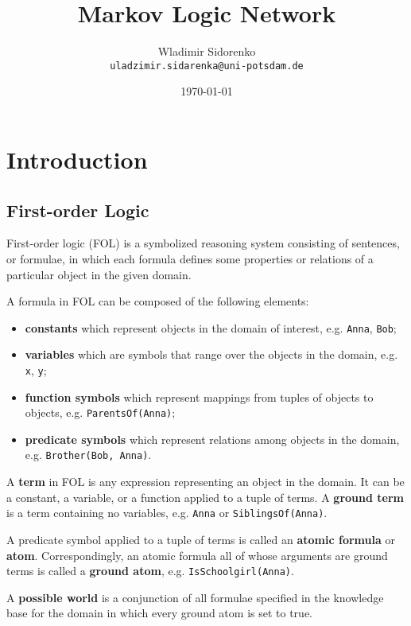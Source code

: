 \documentclass{beamer}
\title[]{Markov Logic Network}
\author[Sidorenko]{Wladimir Sidorenko\\ \texttt{uladzimir.sidarenka{@}uni-potsdam.de}}
\institute{University of Potsdam}
\date{\today}
\begin{document}
\begin{frame}{}
  \titlepage
\end{frame}

\section{Introduction}
\subsection{First-order Logic}
\begin{frame}{\insertsubsection}
  \begin{definition}
    First-order logic (FOL) is a symbolized reasoning system
    consisting of sentences, or formulae, in which each formula
    defines some properties or relations of a particular object in the
    given domain.
  \end{definition}
  A formula in FOL can be composed of the following elements:
  \begin{itemize}
    \item \textbf{constants} which represent objects in the domain of
      interest, e.g. \texttt{Anna}, \texttt{Bob};
    \item \textbf{variables} which are symbols that range over the
      objects in the domain, e.g. \texttt{x}, \texttt{y};
    \item \textbf{function symbols} which represent mappings from
      tuples of objects to objects, e.g. \texttt{ParentsOf(Anna)};
    \item \textbf{predicate symbols} which represent relations among
      objects in the domain, e.g. \texttt{Brother(Bob, Anna)}.
  \end{itemize}
\end{frame}

\begin{frame}{\insertsubsection}
A \textbf{term} in FOL is any expression representing an object in the
domain. It can be a constant, a variable, or a function applied to a
tuple of terms.  A \textbf{ground term} is a term containing no
variables, e.g. \texttt{Anna} or \texttt{SiblingsOf(Anna)}.\vspace{0.5cm}

A predicate symbol applied to a tuple of terms is called an
\textbf{atomic formula} or \textbf{atom}.  Correspondingly, an atomic
formula all of whose arguments are ground terms is called a
\textbf{ground atom}, e.g. \texttt{IsSchoolgirl(Anna)}.\vspace{0.5cm}

A \textbf{possible world} is a conjunction of all formulae specified
in the knowledge base for the domain in which every ground atom is set
to true.
\end{frame}
\end{document}
